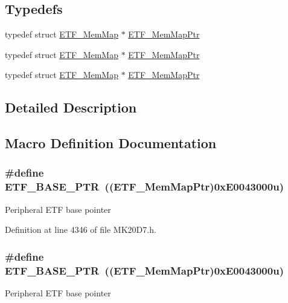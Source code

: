 \subsection*{Typedefs}
\begin{DoxyCompactItemize}
\item 
typedef struct \hyperlink{struct_e_t_f___mem_map}{E\+T\+F\+\_\+\+Mem\+Map} $\ast$ \hyperlink{group___e_t_f___peripheral_ga3b20bc884bec4b23870d47a4e2f9a118}{E\+T\+F\+\_\+\+Mem\+Map\+Ptr}
\item 
typedef struct \hyperlink{struct_e_t_f___mem_map}{E\+T\+F\+\_\+\+Mem\+Map} $\ast$ \hyperlink{group___e_t_f___peripheral_ga3b20bc884bec4b23870d47a4e2f9a118}{E\+T\+F\+\_\+\+Mem\+Map\+Ptr}
\item 
typedef struct \hyperlink{struct_e_t_f___mem_map}{E\+T\+F\+\_\+\+Mem\+Map} $\ast$ \hyperlink{group___e_t_f___peripheral_ga3b20bc884bec4b23870d47a4e2f9a118}{E\+T\+F\+\_\+\+Mem\+Map\+Ptr}
\end{DoxyCompactItemize}


\subsection{Detailed Description}


\subsection{Macro Definition Documentation}
\subsubsection[{\texorpdfstring{E\+T\+F\+\_\+\+B\+A\+S\+E\+\_\+\+P\+TR}{ETF_BASE_PTR}}]{\setlength{\rightskip}{0pt plus 5cm}\#define E\+T\+F\+\_\+\+B\+A\+S\+E\+\_\+\+P\+TR~(({\bf E\+T\+F\+\_\+\+Mem\+Map\+Ptr})0x\+E0043000u)}\hypertarget{group___e_t_f___peripheral_ga46da3f879a5311a0651d7908021daa5e}{}\label{group___e_t_f___peripheral_ga46da3f879a5311a0651d7908021daa5e}
Peripheral E\+TF base pointer 

Definition at line 4346 of file M\+K20\+D7.\+h.

\subsubsection[{\texorpdfstring{E\+T\+F\+\_\+\+B\+A\+S\+E\+\_\+\+P\+TR}{ETF_BASE_PTR}}]{\setlength{\rightskip}{0pt plus 5cm}\#define E\+T\+F\+\_\+\+B\+A\+S\+E\+\_\+\+P\+TR~(({\bf E\+T\+F\+\_\+\+Mem\+Map\+Ptr})0x\+E0043000u)}\hypertarget{group___e_t_f___peripheral_ga46da3f879a5311a0651d7908021daa5e}{}\label{group___e_t_f___peripheral_ga46da3f879a5311a0651d7908021daa5e}
Peripheral E\+TF base pointer 

